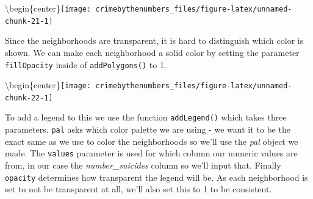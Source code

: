 \documentclass[
]{krantz}
\makeatletter
\newenvironment{Shaded}{\begin{snugshade}}{\end{snugshade}}
\newcommand{\AttributeTok}[1]{\textcolor[rgb]{0.61,0.61,0.61}{#1}}
\newcommand{\DecValTok}[1]{\textcolor[rgb]{0.06,0.06,0.06}{#1}}
\newcommand{\FunctionTok}[1]{\textcolor[rgb]{0,0,0}{#1}}
\newcommand{\NormalTok}[1]{#1}
\newcommand{\OtherTok}[1]{\textcolor[rgb]{0.37,0.37,0.37}{#1}}
\newcommand{\SpecialCharTok}[1]{\textcolor[rgb]{0,0,0}{#1}}
\newcommand{\StringTok}[1]{\textcolor[rgb]{0.5,0.5,0.5}{#1}}
\newenvironment{kframe}{%
\medskip{}
\setlength{\fboxsep}{.8em}
 \def\at@end@of@kframe{}%
 \ifinner\ifhmode%
  \def\at@end@of@kframe{\end{minipage}}%
  \begin{minipage}{\columnwidth}%
 \fi\fi%
 \def\FrameCommand##1{\hskip\@totalleftmargin \hskip-\fboxsep
 \colorbox{shadecolor}{##1}\hskip-\fboxsep
     \hskip-\linewidth \hskip-\@totalleftmargin \hskip\columnwidth}%
 \MakeFramed {\advance\hsize-\width
   \@totalleftmargin\z@ \linewidth\hsize
   \@setminipage}}%
 {\par\unskip\endMakeFramed%
 \at@end@of@kframe}
\renewenvironment{Shaded}{\begin{kframe}}{\end{kframe}}
\makeatother
\begin{document}
\textbackslash begin\{center\}\texttt{[image: crimebythenumbers\_files/figure-latex/unnamed-chunk-21-1]}

Since the neighborhoods are transparent, it is hard to distinguish which color is shown. We can make each neighborhood a solid color by setting the parameter \texttt{fillOpacity} inside of \texttt{addPolygons()} to 1.

\begin{Shaded}
\end{Shaded}

\textbackslash begin\{center\}\texttt{[image: crimebythenumbers\_files/figure-latex/unnamed-chunk-22-1]}

To add a legend to this we use the function \texttt{addLegend()} which takes three parameters. \texttt{pal} asks which color palette we are using - we want it to be the exact same as we use to color the neighborhoods so we'll use the \emph{pal} object we made. The \texttt{values} parameter is used for which column our numeric values are from, in our case the \emph{number\_suicides} column so we'll input that. Finally \texttt{opacity} determines how transparent the legend will be. As each neighborhood is set to not be transparent at all, we'll also set this to 1 to be consistent.
\end{document}
